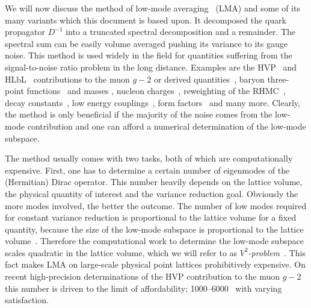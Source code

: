 We will now discuss the method of low-mode averaging~\cite{Neff_2001,DeGrand_2004,Giusti_2004,} (LMA) and some of its many variants which this document is based upon.
It decomposed the quark propagator $D^{-1}$ into a truncated spectral decomposition and a remainder.
The spectral sum can be easily volume averaged pushing its variance to its gauge noise.
This method is used widely in the field for quantities suffering from the signal-to-noise ratio problem in the long distance.
Examples are the HVP~\cite{bmw_2024,Kuberski_2023,Aubin:2022hgm,Bazavov:2024eou,RBC_2024} and HLbL~\cite{Lin:2024khg} contributions to the muon $g-2$ or derived quantities~\cite{ExtendedTwistedMass:2025tpc}, baryon three-point functions~\cite{Yang:2015zja,Ohki:2012jyg} and masses \cite{Bali:2010se}, nucleon charges~\cite{Yamanaka:2018uud}, reweighting of the RHMC~\cite{Kuberski:2023zky}, decay constants~\cite{Bali:2014pva}, low energy couplings~\cite{Bernardoni:2011kd}, form factors~\cite{JLQCD:2009ofg} and many more.
Clearly, the method is only beneficial if the majority of the noise comes from the low-mode contribution and one can afford a numerical determination of the low-mode subspace.

The method usually comes with two tasks, both of which are computationally expensive.
First, one has to determine a certain number of eigenmodes of the (Hermitian) Dirac operator.
This number heavily depends on the lattice volume, the physical quantity of interest and the variance reduction goal.
Obviously the more modes involved, the better the outcome.
The number of low modes required for constant variance reduction is proportional to the lattice volume for a fixed quantity, because the size of the low-mode subspace is proportional to the lattice volume~\cite{banks1980}.
Therefore the computational work to determine the low-mode subspace scales quadratic in the lattice volume, which we will refer to as \emph{$V^{2}$-problem}~\cite{Luescher2007}.
This fact makes LMA on large-scale physical point lattices prohibitively expensive.
On recent high-precision determinations of the HVP contribution to the muon $g-2$ this number is driven to the limit of affordability; \numrange{1000}{6000}~\cite{Djukanovic:2024cmq,RBC_2024,bmw_2024,Aubin:2022hgm} with varying satisfaction.

